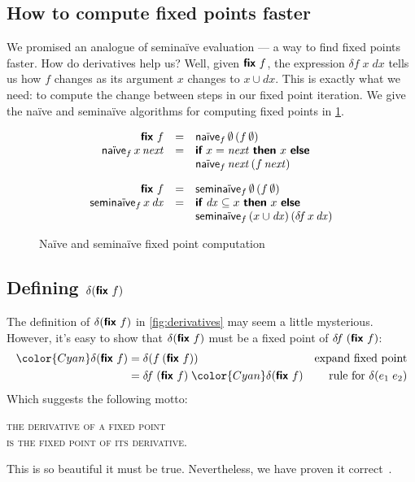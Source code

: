 \documentclass[sigplan,screen,dvipsnames]{acmart}
\newcommand{\hilited}{\color{Cyan}}
\newcommand{\naive}{na\"ive}
\renewcommand{\d}{\delta}
\newcommand{\kw}[1]{\textsf{\bfseries #1}}
\newcommand{\tlv}[1]{\textsf{#1}}
\newcommand{\var}[1]{\mathit{#1}}
\newcommand{\dee}[1]{\var{d#1}}
\newcommand{\efix}{\kw{fix}~}
\begin{document}

\subsection{How to compute fixed points faster}

We promised an analogue of semi\naive{} evaluation --- a way to find fixed
points faster. How do derivatives help us? Well, given $\efix f$, the expression
$\d\!f \;x \;dx$ tells us how $f$ changes as its argument $x$ changes to $x \cup
dx$. This is exactly what we need: to compute the change between steps in our
fixed point iteration. We give the na\"ive and semina\"ive algorithms for computing fixed points in \cref{fig:defining-fix}.

\begin{figure}
  \[
  \begin{array}{rcl}
  \efix f &=& \tlv{\naive}_f \,\emptyset \,(f\, \emptyset)\\
  \tlv{\naive}_f \,x \,\var{next}
  &=& \kw{if}~ x = \var{next} ~\kw{then}~ x ~\kw{else}\\
  && \tlv{\naive}_f \,\var{next} \,(f \,\var{next})

  \vspace{1em}\\

  \efix f &=& \tlv{semi\naive}_f \,\emptyset \,(f\, \emptyset)\\
  \tlv{semi\naive}_f \,x \,\dee x
  &=& \kw{if}~ \dee x \subseteq x ~\kw{then}~ x ~\kw{else}\\
  && \tlv{semi\naive}_f \,(x \cup \dee x) \,(\d\!f \,x \,\dee x)
  \end{array}
  \]
  \vspace{-.5em}
  \caption{Na\"ive and semina\"ive fixed point computation}
  \label{fig:defining-fix}
\end{figure}

\subsection{Defining \texorpdfstring{$\d(\efix f)$}{d(fix f)}}

The definition of $\d(\efix f)$ in \cref{fig:derivatives} may seem a little
mysterious. However, it's easy to show that $\d(\efix f)$ must be a fixed point
of $\d\!f\;(\efix f)$:
%
\begin{align*}
  {\hilited \d(\efix f)}
  &= \d(f\: (\efix f))
  & \text{expand fixed point}\\
  &= \d\!f\; (\efix f)\; {\hilited \d(\efix f)}
  & \text{rule for}~\delta(e_1\;e_2)
\end{align*}
%
Which suggests the following motto:
\begin{center}
  \large \scshape
  the derivative of a fixed point\nopagebreak\\
  is the fixed point of its derivative.
\end{center}
%
This is so beautiful it must be true. Nevertheless, we have proven it
correct~\citep{fixderiv}.
\end{document}
